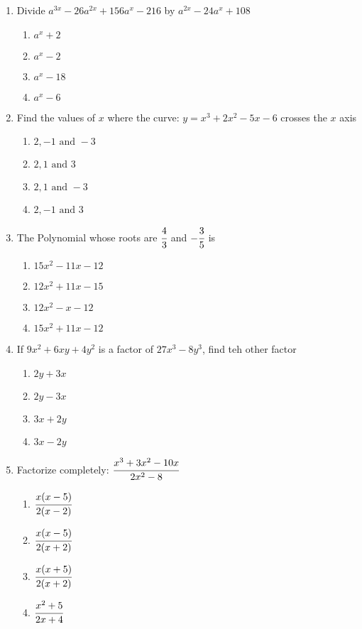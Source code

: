 \begin{multicols}{2}
\begin{enumerate}[label={\arabic*.}]
\begin{enumerate}[label={\Alph*.}]
	\end{enumerate}
\item Divide $a^{3x} - 26a^{2x} + 156a^x - 216 $ by $a^{2x} - 24a^x + 108$
	\begin{enumerate}[label={\Alph*.}]
	\item \( a^x + 2\)
	\item \(a^x - 2\)
	\item \(a^x -18\)
	\item \(a^x -6\)
	\end{enumerate}
\item Find the values of $x$ where the curve: $y = x^3 + 2x^2 -5x -6$ crosses the $x$ axis
	\begin{enumerate}[label={\Alph*.}]
	\item \(2, -1 \text{ and } -3\)
	\item \(2, 1 \text{ and } 3\)
	\item \(2, 1 \text{ and } -3\)
	\item \(2, -1 \text{ and } 3\)
	\end{enumerate}
\item The Polynomial whose roots are $\cfrac{4}{3}$ and $-\cfrac{3}{5}$ is
	\begin{enumerate}[label={\Alph*.}]
	\item \(15x^2 - 11x -12 \)
	\item \(12x^2 + 11x -15\)
	\item \(12x^2 - x -12\)
	\item \(15x^2 + 11x -12\)
	\end{enumerate}
\item If $9x^2 + 6xy + 4y^2$ is a factor of $27x^3 - 8y^3$, find teh other factor
	\begin{enumerate}[label={\Alph*.}]
	\item \(2y + 3x\)
	\item \(2y - 3x\)
	\item \(3x + 2y\)
	\item \(3x - 2y\)
	\end{enumerate}
\item Factorize completely: $\cfrac{x^3 + 3x^2 -10x}{2x^2 - 8}$
	\begin{enumerate}[label={\Alph*.}]
	\item \(\cfrac{x(x-5)}{2(x-2)}\)
	\item \(\cfrac{x(x-5)}{2(x+2)}\)
	\item \(\cfrac{x(x+5)}{2(x+2)}\)
	\item \(\cfrac{x^2 + 5}{2x + 4}\)
	\end{enumerate}

\end{enumerate}
\end{multicols}
